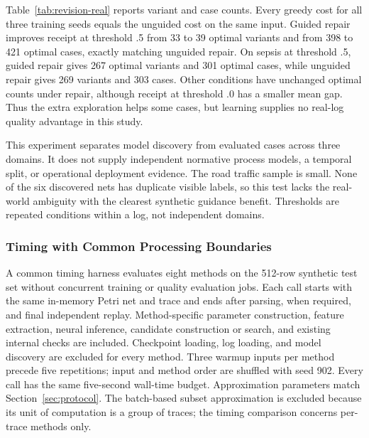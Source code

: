 \begin{revised}


Table~\ref{tab:revision-real} reports variant and case counts. Every greedy cost for all three training seeds equals the unguided cost on the same input. Guided repair improves receipt at threshold .5 from 33 to 39 optimal variants and from 398 to 421 optimal cases, exactly matching unguided repair. On sepsis at threshold .5, guided repair gives 267 optimal variants and 301 optimal cases, while unguided repair gives 269 variants and 303 cases. Other conditions have unchanged optimal counts under repair, although receipt at threshold .0 has a smaller mean gap. Thus the extra exploration helps some cases, but learning supplies no real-log quality advantage in this study.

This experiment separates model discovery from evaluated cases across three domains. It does not supply independent normative process models, a temporal split, or operational deployment evidence. The road traffic sample is small. None of the six discovered nets has duplicate visible labels, so this test lacks the real-world ambiguity with the clearest synthetic guidance benefit. Thresholds are repeated conditions within a log, not independent domains.

\subsubsection{Timing with Common Processing Boundaries}

A common timing harness evaluates eight methods on the 512-row synthetic test set without concurrent training or quality evaluation jobs. Each call starts with the same in-memory Petri net and trace and ends after parsing, when required, and final independent replay. Method-specific parameter construction, feature extraction, neural inference, candidate construction or search, and existing internal checks are included. Checkpoint loading, log loading, and model discovery are excluded for every method. Three warmup inputs per method precede five repetitions; input and method order are shuffled with seed 902. Every call has the same five-second wall-time budget. Approximation parameters match Section~\ref{sec:protocol}. The batch-based subset approximation is excluded because its unit of computation is a group of traces; the timing comparison concerns per-trace methods only.




\end{revised}
